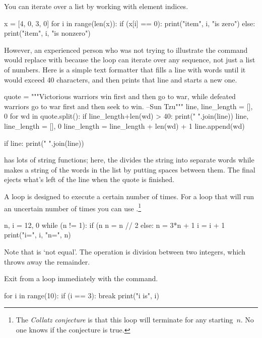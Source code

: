 You can iterate over a list by working with element indices.
\begin{pythonconsole}
x = [4, 0, 3, 0]
for i in range(len(x)):
    if (x[i] == 0):
        print("item", i, "is zero")
    else:
        print("item", i, "is nonzero")

\end{pythonconsole}
\noindent
However, an experienced  \python{} person who was not trying to illustrate 
the  command
would replace 
with  because
the  loop can iterate over any sequence, not just
a list of numbers.
Here is a simple text formatter that fills a line with words until
it would exceed 40 characters, and then
prints that line and starts a new one.
\begin{pythonconsole}
quote = """Victorious warriors win first and then go to war, 
while defeated warriors go to war first and then seek to win. 
--Sun Tzu"""
line, line_length = [], 0
for wd in quote.split():
    if line_length+len(wd) > 40:
        print(" ".join(line))
        line, line_length = [], 0
    line_length = line_length + len(wd) + 1
    line.append(wd)

if line:
    print(" ".join(line))

\end{pythonconsole}
\python{} has lots of string functions; here,
the  divides the string into separate words while
 makes a string of the words in the list 
 by putting spaces between them.
The final  ejects what's left of the line
when the quote is finished.

A  loop is designed to execute a certain
number of times.
For a loop that will run an uncertain number of times
you can use .\footnote{The 
\protect\textit{Collatz conjecture} is 
that this loop will 
terminate for any starting~$n$.
No one knows if the conjecture is true.}
\begin{pythonconsole}
n, i = 12, 0
while (n != 1):
    if (n %
        n = n // 2
    else:
        n = 3*n + 1
    i = i + 1
    print("i=", i, "n=", n)

\end{pythonconsole}
\noindent
Note that \inlinecode{!=} is `not equal'. 
The \inlinecode{//} operation is division between two integers, which
throws away the remainder.

Exit from a loop immediately with the  command.
\begin{pythonconsole}
for i in range(10):
    if (i == 3):
        break
    print("i is", i)

\end{pythonconsole}


